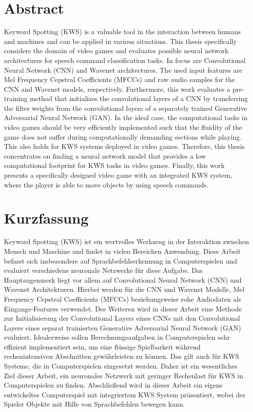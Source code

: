 
\chapter*{Abstract}\label{sec:shards_abstract}
Keyword Spotting (KWS) is a valuable tool in the interaction between humans and machines and can be applied in various situations.
This thesis specifically considers the domain of video games and evaluates possible neural network architectures for speech command classification tasks.
In focus are Convolutional Neural Network (CNN) and Wavenet architectures.
The used input features are Mel Frequency Cepstral Coefficients (MFCCs) and raw audio samples for the CNN and Wavenet models, respectively.
Furthermore, this work evaluates a pre-training method that initializes the convolutional layers of a CNN by transferring the filter weights from the convolutional layers of a separately trained Generative Adversarial Neural Network (GAN).
In the ideal case, the computational tasks in video games should be very efficiently implemented such that the fluidity of the game does not suffer during computationally demanding sections while playing.
This also holds for KWS systems deployed in video games.
Therefore, this thesis concentrates on finding a neural network model that provides a low computational footprint for KWS tasks in video games.
Finally, this work presents a specifically designed video game with an integrated KWS system, where the player is able to move objects by using speech commands.



\chapter*{Kurzfassung}
Keyword Spotting (KWS) ist ein wertvolles Werkzeug in der Interaktion zwischen Mensch und Maschine und findet in vielen Bereichen Anwendung.
Diese Arbeit befasst sich insbesondere auf Sprachbefehlserkennung in Computerspielen und evaluiert verschiedene neuronale Netzwerke für diese Aufgabe.
Das Hauptaugenmerk liegt vor allem auf Convolutional Neural Network (CNN) und Wavenet Architekturen.
Hierbei werden für die CNN und Wavenet Modelle, Mel Frequency Cepstral Coefficients (MFCCs) beziehungsweise rohe Audiodaten als Eingangs-Features verwendet.
Des Weiteren wird in dieser Arbeit eine Methode zur Initialisierung der Convolutional Layers eines CNNs mit den Convolutional Layers eines separat trainierten Generative Adversarial Neural Network (GAN) evaluiert.
Idealerweise sollen Berechnungsaufgaben in Computerspielen sehr effizient implementiert sein, um eine flüssige Spielbarkeit während rechenintensiven Abschnitten gewährleisten zu können.
Das gilt auch für KWS Systeme, die in Computerspielen eingesetzt werden.
Daher ist ein wesentliches Ziel dieser Arbeit, ein neuronales Netzwerk mit geringer Rechenlast für KWS in Computerspielen zu finden.
Abschließend wird in dieser Arbeit ein eigens entwickeltes Computerspiel mit integriertem KWS System präsentiert, wobei der Spieler Objekte mit Hilfe von Sprachbefehlen bewegen kann.